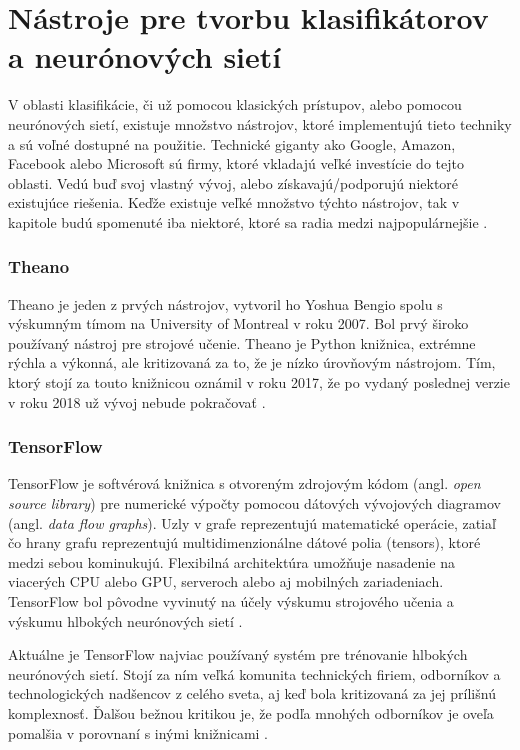 
\section{Nástroje pre tvorbu klasifikátorov a neurónových sietí}
\label{sec:frameworks}
V oblasti klasifikácie, či už pomocou klasických prístupov, alebo pomocou neurónových sietí, existuje množstvo nástrojov,
    ktoré implementujú tieto techniky a sú voľné dostupné na použitie.
Technické giganty ako Google, Amazon, Facebook alebo Microsoft sú firmy, ktoré vkladajú veľké investície do tejto oblasti.
Vedú buď svoj vlastný vývoj, alebo získavajú/podporujú niektoré existujúce riešenia.
Keďže existuje veľké množstvo týchto nástrojov, tak v kapitole budú spomenuté iba niektoré, ktoré sa radia medzi najpopulárnejšie \cite{odkaz:FrameworkComparison}.

\subsubsection{Theano}
Theano je jeden z prvých nástrojov, vytvoril ho Yoshua Bengio spolu s výskumným tímom na University of Montreal v roku 2007.
Bol prvý široko používaný nástroj pre strojové učenie.
Theano je Python knižnica, extrémne rýchla a výkonná, ale kritizovaná za to, že je nízko úrovňovým nástrojom.
Tím, ktorý stojí za touto knižnicou oznámil v roku 2017, že po vydaný poslednej verzie v roku 2018 už vývoj nebude pokračovať \cite{odkaz:FrameworkComparison}.

\subsubsection{TensorFlow}
TensorFlow je softvérová knižnica s otvoreným zdrojovým kódom (angl. \textit{open source library}) pre numerické výpočty pomocou dátových vývojových diagramov (angl. \textit{data flow graphs}).
Uzly v grafe reprezentujú matematické operácie, zatiaľ čo hrany grafu reprezentujú multidimenzionálne dátové polia (tensors), ktoré medzi sebou kominukujú.
Flexibilná architektúra umožňuje nasadenie na viacerých CPU alebo GPU, serveroch alebo aj mobilných zariadeniach.
TensorFlow bol pôvodne vyvinutý na účely výskumu strojového učenia a výskumu hlbokých neurónových sietí \cite{odkaz:TensorFlow}.

Aktuálne je TensorFlow najviac používaný systém pre trénovanie hlbokých neurónových sietí.
Stojí za ním veľká komunita technických firiem, odborníkov a technologických nadšencov z celého sveta, aj keď bola kritizovaná za jej prílišnú komplexnosť.
Ďalšou bežnou kritikou je, že podľa mnohých odborníkov je oveľa pomalšia v porovnaní s inými knižnicami \cite{odkaz:FrameworkComparison}.

